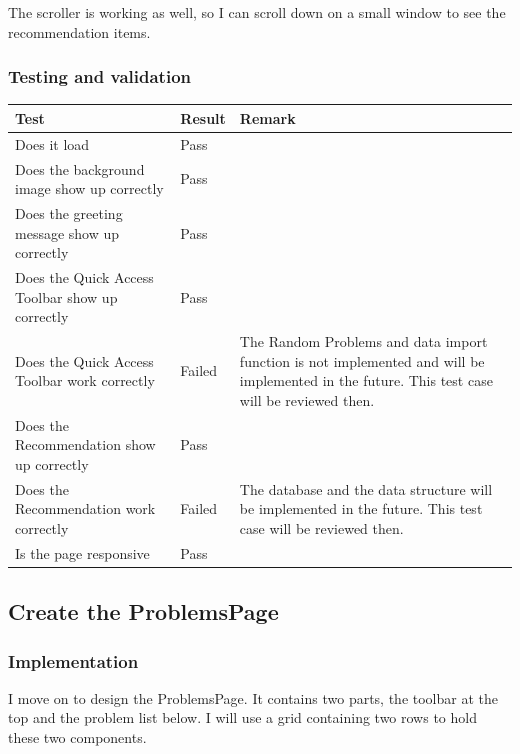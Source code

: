 \documentclass[a4paper]{report}
\begin{document}
The scroller is working as well, so I can scroll down on a small window to see the recommendation items.

\subsubsection{Testing and validation}

\begin{tabulary}{\linewidth}{|L|l|L|}
    \hline
    Test & Result & Remark \\
    \hline
    Does it load & Pass & \\
    \hline
    Does the background image show up correctly & Pass & \\
    \hline
    Does the greeting message show up correctly & Pass & \\
    \hline
    Does the Quick Access Toolbar show up correctly & Pass & \\
    \hline
    Does the Quick Access Toolbar work correctly & Failed & The Random Problems and data import function is not implemented and will be implemented in the future. This test case will be reviewed then. \\
    \hline
    Does the Recommendation show up correctly & Pass &  \\
    \hline
    Does the Recommendation work correctly & Failed & The database and the data structure will be implemented in the future. This test case will be reviewed then. \\
    \hline
    Is the page responsive & Pass & \\
    \hline
\end{tabulary}

\subsection{Create the ProblemsPage}

\subsubsection{Implementation}

I move on to design the ProblemsPage. It contains two parts, the toolbar at the top and the problem list below. I will use a grid containing two rows to hold these two components.
\end{document}

